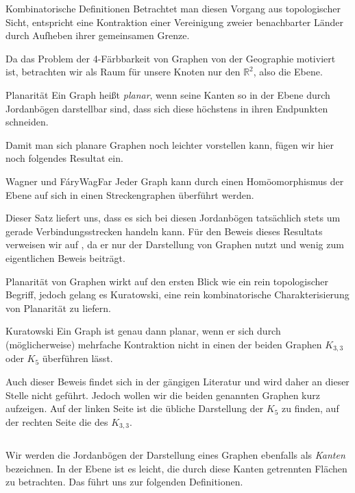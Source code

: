 \begin{section}{Kombinatorische Definitionen}
  Betrachtet man diesen Vorgang aus topologischer Sicht, entspricht eine Kontraktion einer Vereinigung zweier benachbarter Länder durch Aufheben ihrer gemeinsamen Grenze.
  
  Da das Problem der 4-Färbbarkeit von Graphen von der Geographie motiviert ist, betrachten wir als Raum für unsere Knoten nur den $\mathbb{R}^2$, also die Ebene.
  
  \begin{definition}{Planarität}
   Ein Graph heißt \textit{planar}, wenn seine Kanten so in der Ebene durch Jordanbögen darstellbar sind, dass sich diese höchstens in ihren Endpunkten schneiden.
  \end{definition}
  
  Damit man sich planare Graphen noch leichter vorstellen kann, fügen wir hier noch folgendes Resultat ein.
  
  \begin{satzl}{Wagner und Fáry}{WagFar}
   Jeder Graph kann durch einen Homöomorphismus der Ebene auf sich in einen Streckengraphen überführt werden.
  \end{satzl}
  
  Dieser Satz liefert uns, dass es sich bei diesen Jordanbögen tatsächlich stets um gerade Verbindungsstrecken handeln kann. Für den Beweis dieses Resultats verweisen wir auf \cite[Seite 113]{fritsch}, da er nur der Darstellung von Graphen nutzt und wenig zum eigentlichen Beweis beiträgt. 
  
  Planarität von Graphen wirkt auf den ersten Blick wie ein rein topologischer Begriff, jedoch gelang es Kuratowski, eine rein kombinatorische Charakterisierung von Planarität zu liefern.
  
  \begin{satz}{Kuratowski}
   Ein Graph ist genau dann planar, wenn er sich durch (möglicherweise) mehrfache Kontraktion nicht in einen der beiden Graphen $K_{3,3}$ oder $K_5$ überführen lässt.
  \end{satz}
  
  Auch dieser Beweis findet sich in der gängigen Literatur und wird daher an dieser Stelle nicht geführt. Jedoch wollen wir die beiden genannten Graphen kurz aufzeigen. Auf der linken Seite ist die übliche Darstellung der $K_5$ zu finden, auf der rechten Seite die des $K_{3,3}$.
  
  \[  \]

  Wir werden die Jordanbögen der Darstellung eines Graphen ebenfalls als \textit{Kanten} bezeichnen. In der Ebene ist es leicht, die durch diese Kanten getrennten Flächen zu betrachten. Das führt uns zur folgenden Definitionen.
  

\end{section}
